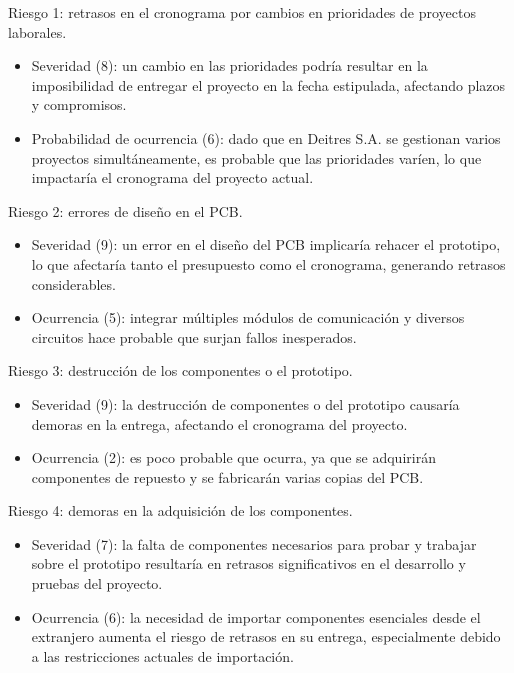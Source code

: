 \documentclass[
11pt, %
]{charter}
\begin{document}
Riesgo 1: retrasos en el cronograma por cambios en prioridades de proyectos laborales.
\begin{itemize}
	\item Severidad (8): un cambio en las prioridades podría resultar en la imposibilidad de entregar el proyecto en la fecha estipulada, afectando plazos y compromisos.\\
	\item Probabilidad de ocurrencia (6): dado que en Deitres S.A. se gestionan varios proyectos simultáneamente, es probable que las prioridades varíen, lo que impactaría el cronograma del proyecto actual.\\
\end{itemize}   

Riesgo 2: errores de diseño en el PCB.
\begin{itemize}
	\item Severidad (9): un error en el diseño del PCB implicaría rehacer el prototipo, lo que afectaría tanto el presupuesto como el cronograma, generando retrasos considerables.\\
	\item Ocurrencia (5): integrar múltiples módulos de comunicación y diversos circuitos hace probable que surjan fallos inesperados.\\
\end{itemize}   

Riesgo 3: destrucción de los componentes o el prototipo.
\begin{itemize}
	\item Severidad (9):  la destrucción de componentes o del prototipo causaría demoras en la entrega, afectando el cronograma del proyecto.\\
	\item Ocurrencia (2):  es poco probable que ocurra, ya que se adquirirán componentes de repuesto y se fabricarán varias copias del PCB.\\
\end{itemize}   

Riesgo 4:  demoras en la adquisición de los componentes.
\begin{itemize}
	\item Severidad (7): la falta de componentes necesarios para probar y trabajar sobre el prototipo resultaría en retrasos significativos en el desarrollo y pruebas del proyecto.\\
	\item Ocurrencia (6): la necesidad de importar componentes esenciales desde el extranjero aumenta el riesgo de retrasos en su entrega, especialmente debido a las restricciones actuales de importación.\\
\end{itemize}   
\end{document}
